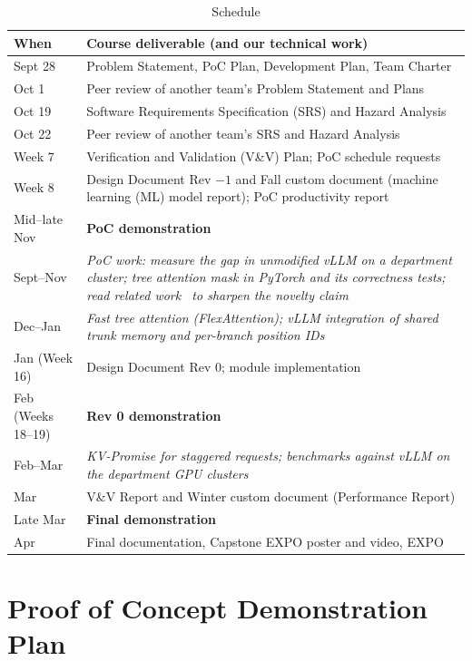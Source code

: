 \documentclass{article}
\begin{document}
\begin{table}[ht]
\caption{Schedule} \label{TblSchedule}
\begin{tabularx}{\textwidth}{lX}
\toprule
\textbf{When} & \textbf{Course deliverable (and our technical work)}\\
\midrule
Sept 28 & Problem Statement, PoC Plan, Development Plan, Team Charter\\
Oct 1 & Peer review of another team's Problem Statement and Plans\\
Oct 19 & Software Requirements Specification (SRS) and Hazard Analysis\\
Oct 22 & Peer review of another team's SRS and Hazard Analysis\\
Week 7 & Verification and Validation (V\&V) Plan; PoC schedule requests\\
Week 8 & Design Document Rev $-1$ and Fall custom document (machine
learning (ML) model report); PoC productivity report\\
Mid--late Nov & \textbf{PoC demonstration}\\
\midrule
Sept--Nov & \emph{PoC work: measure the gap in unmodified vLLM on a
department cluster; tree attention mask in PyTorch and its correctness
tests; read related work~\cite{Juravsky2024Hydragen,
Yao2025DeFT,
Ye2025FlashInfer} to sharpen the novelty claim}\\
Dec--Jan & \emph{Fast tree attention (FlexAttention); vLLM integration of
shared trunk memory and per-branch position IDs}\\
\midrule
Jan (Week 16) & Design Document Rev 0; module implementation\\
Feb (Weeks 18--19) & \textbf{Rev 0 demonstration}\\
\midrule
Feb--Mar & \emph{KV-Promise for staggered requests; benchmarks against vLLM
on the department GPU clusters}\\
\midrule
Mar & V\&V Report and Winter custom document (Performance Report)\\
Late Mar & \textbf{Final demonstration}\\
Apr & Final documentation, Capstone EXPO poster and video, EXPO\\
\bottomrule
\end{tabularx}
\end{table}

\section{Proof of Concept Demonstration Plan}
\label{sec:poc}
\end{document}
